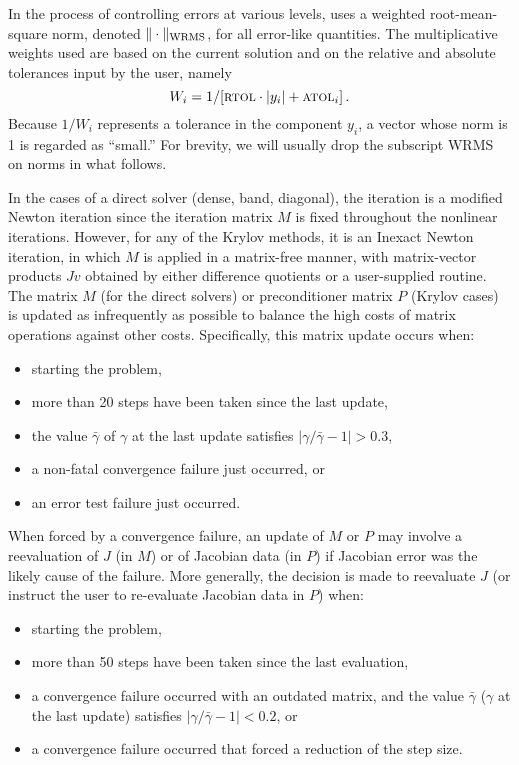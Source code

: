 In the process of controlling errors at various levels, {\cvodes} uses
a weighted root-mean-square norm, denoted
$\|\cdot\|_{\mbox{\scriptsize WRMS}}$, for all error-like quantities.
The multiplicative weights used are based on the current solution and
on the relative and absolute tolerances input by the user, namely
\begin{equation}\label{e:errwt}
 W_i = 1 / [ \mbox{\sc rtol} \cdot |y_i| + \mbox{\sc atol}_i ] \, .
\end{equation}
Because $1/W_i$ represents a tolerance in the component $y_i$, a vector
whose norm is 1 is regarded as ``small.''  For brevity, we will
usually drop the subscript WRMS on norms in what follows.

In the cases of a direct solver (dense, band, diagonal), the
iteration is a modified Newton iteration since the iteration matrix
$M$ is fixed throughout the nonlinear iterations.  However, for any
of the Krylov methods, it is an Inexact Newton iteration, in which $M$
is applied in a matrix-free manner, with matrix-vector products $Jv$
obtained by either difference quotients or a user-supplied routine.
The matrix $M$ (for the direct solvers) or preconditioner matrix $P$
(Krylov cases) is updated as infrequently as possible to balance the
high costs of matrix operations against other costs.  Specifically,
this matrix update occurs when:
\begin{itemize}
\item starting the problem,
\item more than 20 steps have been taken since the last update,
\item the value $\bar{\gamma}$ of $\gamma$ at the last update
satisfies $|\gamma/\bar{\gamma} - 1| > 0.3$,
\item a non-fatal convergence failure just occurred, or
\item an error test failure just occurred.
\end{itemize}
When forced by a convergence failure, an update of $M$ or $P$ may
involve a reevaluation of $J$ (in $M$) or of Jacobian data
(in $P$) if Jacobian error was the likely cause of
the failure.  More generally, the decision is made to reevaluate $J$
(or instruct the user to re-evaluate Jacobian data in $P$) when:
\begin{itemize}
\item starting the problem,
\item more than 50 steps have been taken since the last evaluation,
\item a convergence failure occurred with an outdated matrix, and
the value $\bar{\gamma}$ ($\gamma$ at the last update)
satisfies $|\gamma/\bar{\gamma} - 1| < 0.2$, or
\item a convergence failure occurred that forced a reduction of the step size.
\end{itemize}

